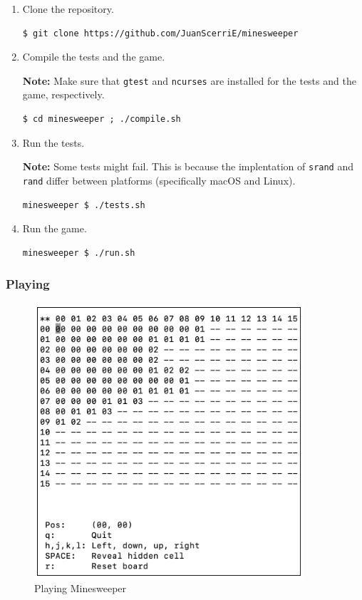 \documentclass[12pt]{article}
\begin{document}
\begin{enumerate}
\item
    Clone the repository.
\begin{lstlisting}
$ git clone https://github.com/JuanScerriE/minesweeper
\end{lstlisting}

\item
    Compile the tests and the game.

    \textbf{Note:} Make sure that \texttt{gtest} and
    \texttt{ncurses} are installed for the tests and the game,
    respectively.
\begin{lstlisting}
$ cd minesweeper ; ./compile.sh
\end{lstlisting}

\item
    Run the tests.

    \textbf{Note:} Some tests might fail. This is because the
    implentation of \texttt{srand} and \texttt{rand} differ
    between platforms (specifically macOS and Linux).
\begin{lstlisting}
minesweeper $ ./tests.sh
\end{lstlisting}

\item
    Run the game.
\begin{lstlisting}
minesweeper $ ./run.sh
\end{lstlisting}

\end{enumerate}

\subsubsection{Playing}

\begin{figure}[H]
    \centering
    \includegraphics[width=10cm]{./images/playing-minesweeper.png}
    \caption{Playing Minesweeper}
    \label{playing-minesweeper}
\end{figure}
\end{document}
